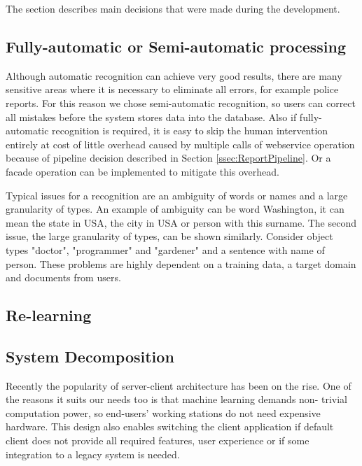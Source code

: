 
The section describes main decisions that were made during the development. 

\subsection{Fully-automatic or Semi-automatic processing}

Although automatic recognition can achieve very good results, there are many
sensitive areas where it is necessary to eliminate all errors, for example
police reports. For this reason we chose semi-automatic recognition, so users
can correct all mistakes before the system stores data into the database. 
Also if fully-automatic recognition is required, it is easy
to skip the human intervention entirely at cost of little overhead caused by
multiple calls of webservice operation because of pipeline decision described in
Section \ref{ssec:ReportPipeline}. Or a facade operation can be implemented to
mitigate this overhead.

Typical issues for a recognition are an ambiguity of words or names and a large
granularity of types. An example of ambiguity can be word Washington, it can mean
the state in USA, the city in USA or person with this surname. The second issue,
the large granularity of types, can be shown similarly. Consider object types "doctor",
"programmer" and "gardener" and a sentence with name of person. These problems are
highly dependent on a training data, a target domain and documents from users.

\subsection{Re-learning}

\subsection{System Decomposition}




Recently the popularity of server-client architecture has been on the rise. One
of the reasons it suits our needs too is that machine learning demands non-
trivial computation power, so end-users' working stations do not need expensive
hardware. This design also enables switching the client application if default
\textan{} client does not provide all required features, user experience or if
some integration to a legacy system is needed.

